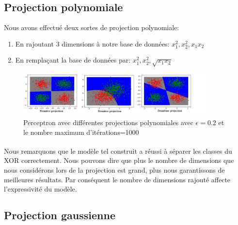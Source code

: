 \documentclass{report}
\begin{document}
\subsection{Projection polynomiale}
Nous avons effectué deux sortes de projection polynomiale:
\begin{enumerate}
	\item En rajoutant 3 dimensions à notre base de données: $x_1^2,x_2^2,x_1x_2$
	\item En remplaçant la base de données par: $x_1^2,x_2^2,\sqrt{x_1x_2}$
\end{enumerate}
 \begin{figure}[H]
	\begin{center}
		\includegraphics[width=0.9\textwidth]{proj.png}
		\caption{Perceptron avec différentes projections polynomiales avec $\epsilon=0.2$ et le nombre maximum d'itérations=1000}
	\end{center}
\end{figure}
\paragraph{}
Nous remarquons que le modèle tel construit a réussi à séparer les classes du XOR correctement. Nous pouvons dire que plus le nombre de dimensions que nous considérons lors de la projection est grand, plus nous garantissons de meilleures résultats. Par conséquent le nombre de dimensions rajouté affecte l'expressivité du modèle.
\subsection{Projection gaussienne}
\end{document}
